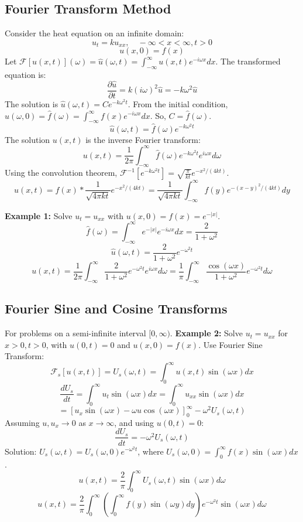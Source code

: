 \documentclass{article}
\begin{document}
	\subsection*{Fourier Transform Method}
	Consider the heat equation on an infinite domain:
	$$ u_t = k u_{xx}, \quad -\infty < x < \infty, t>0 $$
	$$ u(x,0) = f(x) $$
	Let $\mathcal{F}[u(x,t)](\omega) = \hat{u}(\omega, t) = \int_{-\infty}^{\infty} u(x,t) e^{-i\omega x} dx$.
	The transformed equation is:
	$$ \frac{\partial \hat{u}}{\partial t} = k (i\omega)^2 \hat{u} = -k\omega^2 \hat{u} $$
	The solution is $\hat{u}(\omega,t) = C e^{-k\omega^2 t}$.
	From the initial condition, $\hat{u}(\omega,0) = \hat{f}(\omega) = \int_{-\infty}^{\infty} f(x) e^{-i\omega x} dx$.
	So, $C = \hat{f}(\omega)$.
	$$ \hat{u}(\omega,t) = \hat{f}(\omega) e^{-k\omega^2 t} $$
	The solution $u(x,t)$ is the inverse Fourier transform:
	$$ u(x,t) = \frac{1}{2\pi} \int_{-\infty}^{\infty} \hat{f}(\omega) e^{-k\omega^2 t} e^{i\omega x} d\omega $$
	Using the convolution theorem, $\mathcal{F}^{-1}[e^{-k\omega^2 t}] = \sqrt{\frac{\pi}{kt}} e^{-x^2/(4kt)}$.
	$$ u(x,t) = f(x) * \frac{1}{\sqrt{4\pi k t}} e^{-x^2/(4kt)} = \frac{1}{\sqrt{4\pi k t}} \int_{-\infty}^{\infty} f(y) e^{-(x-y)^2/(4kt)} dy $$
	
	\textbf{Example 1:}
	Solve $u_t = u_{xx}$ with $u(x,0) = f(x) = e^{-|x|}$.
	$$ \hat{f}(\omega) = \int_{-\infty}^{\infty} e^{-|x|} e^{-i\omega x} dx = \frac{2}{1+\omega^2} $$
	$$ \hat{u}(\omega, t) = \frac{2}{1+\omega^2} e^{-\omega^2 t} $$
	$$ u(x,t) = \frac{1}{2\pi} \int_{-\infty}^{\infty} \frac{2}{1+\omega^2} e^{-\omega^2 t} e^{i\omega x} d\omega = \frac{1}{\pi} \int_{-\infty}^{\infty} \frac{\cos(\omega x)}{1+\omega^2} e^{-\omega^2 t} d\omega $$
	
	\subsection*{Fourier Sine and Cosine Transforms}
	For problems on a semi-infinite interval $[0, \infty)$.
	\textbf{Example 2:}
	Solve $u_t = u_{xx}$ for $x>0, t>0$, with $u(0,t)=0$ and $u(x,0)=f(x)$.
	Use Fourier Sine Transform:
	$$ \mathcal{F}_s[u(x,t)] = U_s(\omega,t) = \int_0^\infty u(x,t) \sin(\omega x) dx $$
	$$ \frac{dU_s}{dt} = \int_0^\infty u_t \sin(\omega x) dx = \int_0^\infty u_{xx} \sin(\omega x) dx $$
	$$ = [u_x \sin(\omega x) - \omega u \cos(\omega x)]_0^\infty - \omega^2 U_s(\omega,t) $$
	Assuming $u, u_x \to 0$ as $x \to \infty$, and using $u(0,t)=0$:
	$$ \frac{dU_s}{dt} = -\omega^2 U_s(\omega,t) $$
	Solution: $U_s(\omega,t) = U_s(\omega,0) e^{-\omega^2 t}$, where $U_s(\omega,0) = \int_0^\infty f(x)\sin(\omega x) dx$.
	$$ u(x,t) = \frac{2}{\pi} \int_0^\infty U_s(\omega,t) \sin(\omega x) d\omega $$
	$$ u(x,t) = \frac{2}{\pi} \int_0^\infty \left( \int_0^\infty f(y) \sin(\omega y) dy \right) e^{-\omega^2 t} \sin(\omega x) d\omega $$
	
\end{document}

